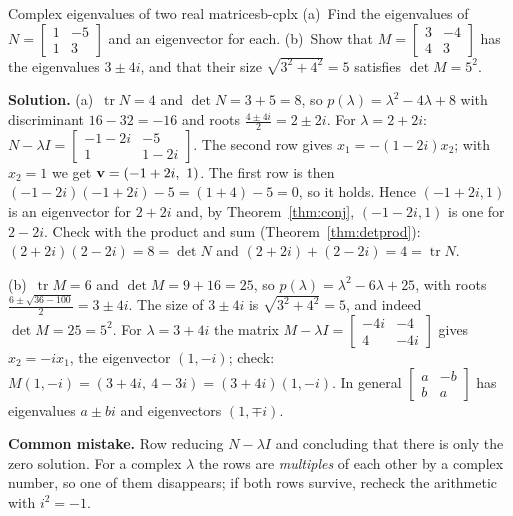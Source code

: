 \documentclass[11pt]{article}
\begin{document}
\begin{exmp}{Complex eigenvalues of two real matrices}{b-cplx}
(a)~Find the eigenvalues of $N=\begin{bmatrix}1&-5\\1&3\end{bmatrix}$ and an eigenvector for each. (b)~Show that $M=\begin{bmatrix}3&-4\\4&3\end{bmatrix}$ has the eigenvalues $3\pm4i$, and that their size $\sqrt{3^2+4^2}=5$ satisfies $\det M=5^2$.

\textbf{Solution.} (a)~$\operatorname{tr}N=4$ and $\det N=3+5=8$, so $p(\lambda)=\lambda^2-4\lambda+8$ with discriminant $16-32=-16$ and roots $\frac{4\pm4i}{2}=2\pm2i$. For $\lambda=2+2i$: $N-\lambda I=\begin{bmatrix}-1-2i&-5\\1&1-2i\end{bmatrix}$. The second row gives $x_1=-(1-2i)x_2$; with $x_2=1$ we get $\mathbf{v}=(-1+2i,\ 1)$. The first row is then $(-1-2i)(-1+2i)-5=(1+4)-5=0$, so it holds. Hence $(-1+2i,1)$ is an eigenvector for $2+2i$ and, by Theorem~\ref{thm:conj}, $(-1-2i,1)$ is one for $2-2i$. Check with the product and sum (Theorem~\ref{thm:detprod}): $(2+2i)(2-2i)=8=\det N$ and $(2+2i)+(2-2i)=4=\operatorname{tr}N$.

(b)~$\operatorname{tr}M=6$ and $\det M=9+16=25$, so $p(\lambda)=\lambda^2-6\lambda+25$, with roots $\frac{6\pm\sqrt{36-100}}{2}=3\pm4i$. The size of $3\pm4i$ is $\sqrt{3^2+4^2}=5$, and indeed $\det M=25=5^2$. For $\lambda=3+4i$ the matrix $M-\lambda I=\begin{bmatrix}-4i&-4\\4&-4i\end{bmatrix}$ gives $x_2=-ix_1$, the eigenvector $(1,-i)$; check: $M(1,-i)=(3+4i,\ 4-3i)=(3+4i)(1,-i)$. In general $\begin{bmatrix}a&-b\\b&a\end{bmatrix}$ has eigenvalues $a\pm bi$ and eigenvectors $(1,\mp i)$.

\textbf{Common mistake.} Row reducing $N-\lambda I$ and concluding that there is only the zero solution. For a complex $\lambda$ the rows are \emph{multiples} of each other by a complex number, so one of them disappears; if both rows survive, recheck the arithmetic with $i^2=-1$.
\end{exmp}
\end{document}
